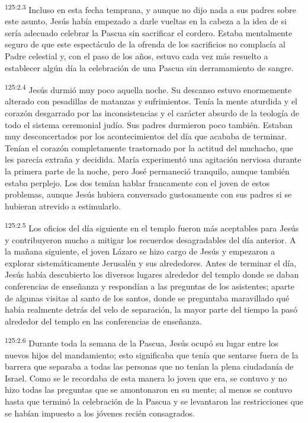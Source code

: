 \par
\textsuperscript{125:2.3} Incluso en esta fecha temprana, y aunque no dijo nada a sus padres sobre este asunto, Jesús había empezado a darle vueltas en la cabeza a la idea de si sería adecuado celebrar la Pascua sin sacrificar el cordero. Estaba mentalmente seguro de que este espectáculo de la ofrenda de los sacrificios no complacía al Padre celestial y, con el paso de los años, estuvo cada vez más resuelto a establecer algún día la celebración de una Pascua sin derramamiento de sangre.

\par
\textsuperscript{125:2.4} Jesús durmió muy poco aquella noche. Su descanso estuvo enormemente alterado con pesadillas de matanzas y sufrimientos. Tenía la mente aturdida y el corazón desgarrado por las inconsistencias y el carácter absurdo de la teología de todo el sistema ceremonial judío. Sus padres durmieron poco también. Estaban muy desconcertados por los acontecimientos del día que acababa de terminar. Tenían el corazón completamente trastornado por la actitud del muchacho, que les parecía extraña y decidida. María experimentó una agitación nerviosa durante la primera parte de la noche, pero José permaneció tranquilo, aunque también estaba perplejo. Los dos temían hablar francamente con el joven de estos problemas, aunque Jesús hubiera conversado gustosamente con sus padres si se hubieran atrevido a estimularlo.

\par
\textsuperscript{125:2.5} Los oficios del día siguiente en el templo fueron más aceptables para Jesús y contribuyeron mucho a mitigar los recuerdos desagradables del día anterior. A la mañana siguiente, el joven Lázaro se hizo cargo de Jesús y empezaron a explorar sistemáticamente Jerusalén y sus alrededores. Antes de terminar el día, Jesús había descubierto los diversos lugares alrededor del templo donde se daban conferencias de enseñanza y respondían a las preguntas de los asistentes; aparte de algunas visitas al santo de los santos, donde se preguntaba maravillado qué había realmente detrás del velo de separación, la mayor parte del tiempo la pasó alrededor del templo en las conferencias de enseñanza.

\par
\textsuperscript{125:2.6} Durante toda la semana de la Pascua, Jesús ocupó su lugar entre los nuevos hijos del mandamiento; esto significaba que tenía que sentarse fuera de la barrera que separaba a todas las personas que no tenían la plena ciudadanía de Israel. Como se le recordaba de esta manera lo joven que era, se contuvo y no hizo todas las preguntas que se amontonaron en su mente; al menos se contuvo hasta que terminó la celebración de la Pascua y se levantaron las restricciones que se habían impuesto a los jóvenes recién consagrados.

